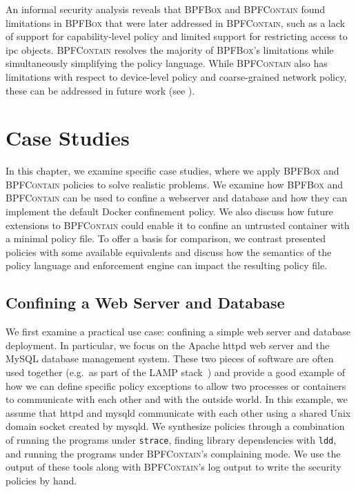 \documentclass[
  fontsize=12pt,
  titlepage=firstiscover,
  paper=letter,
oneside,
  cleardoublepage=plain,
  parskip=half-,
  DIV=10,
  parindent,
  appendixprefix,
  chapterprefix,
  listof=totoc,
]{scrbook}
\newcommand{\bpfbox}{\textsc{BPFBox}}
\newcommand{\bpfcontain}{\textsc{BPFContain}}
\begin{document}
An informal security analysis reveals that \bpfbox{} and \bpfcontain{} found limitations
in \bpfbox{} that were later addressed in \bpfcontain{}, such as a lack of support for
capability-level policy and limited support for restricting access to \gls{ipc} objects.
\bpfcontain{} resolves the majority of \bpfbox{}'s limitations while simultaneously
simplifying the policy language. While \bpfcontain{} also has limitations with respect to
device-level policy and coarse-grained network policy, these can be addressed in future
work (see ).



\chapter{Case Studies}\label{c:case-studies}
In this chapter, we examine specific case studies, where we apply \bpfbox{} and
\bpfcontain{} policies to solve realistic problems. We examine how \bpfbox{} and
\bpfcontain{} can be used to confine a webserver and database and how they can implement
the default Docker confinement policy.  We also discuss how future extensions to
\bpfcontain{} could enable it to confine an untrusted container with a minimal policy file.
To offer a basis for comparison, we contrast presented policies with some available
equivalents and discuss how the semantics of the policy language and enforcement engine
can impact the resulting policy file.



\section{Confining a Web Server and Database}

We first examine a practical use case: confining a simple web server and database
deployment. In particular, we focus on the Apache httpd web server and the MySQL database
management system. These two pieces of software are often used together (e.g.\ as part of
the LAMP stack~\cite{lamp}) and provide a good example of how we can define specific
policy exceptions to allow two processes or containers to communicate with each other and
with the outside world. In this example, we assume that httpd and mysqld communicate with
each other using a shared Unix domain socket created by mysqld. We synthesize policies
through a combination of running the programs under \texttt{strace}, finding library
dependencies with \texttt{ldd}, and running the programs under \bpfcontain{}'s complaining
mode. We use the output of these tools along with \bpfcontain{}'s log output to write
the security policies by hand.
\end{document}
